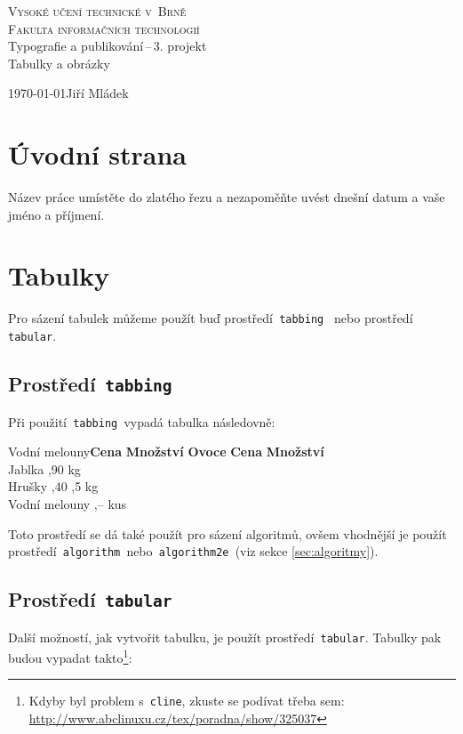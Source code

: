 \documentclass[11pt, a4paper]{article}
\begin{document}
\begin{titlepage}
    \begin{center}
        \Huge
        \textsc{Vysoké učení technické v~Brně}\\
        \huge
        \textsc{Fakulta informačních technologií}\\
        \LARGE
        Typografie a publikování\,--\,3. projekt\\
        \Huge
        Tabulky a obrázky\\
    \end{center}
    {\Large \today \hfill Jiří Mládek}
\end{titlepage}

\section{Úvodní strana}
Název práce umístěte do zlatého řezu a nezapoměňte uvést dnešní datum a vaše jméno a příjmení.

\section{Tabulky}
Pro sázení tabulek můžeme použít buď prostředí\texttt{ tabbing } nebo prostředí\texttt{ tabular}.

\subsection{Prostředí\texttt{ tabbing}}
Při použití\texttt{ tabbing }vypadá tabulka následovně:

\begin{tabbing}
  Vodní melouny\quad \=\textbf{Cena} \quad \= \textbf{Množství}  \quad \kill
  \textbf{Ovoce}    \> \textbf{Cena}    \> \textbf{Množství}  \\
  Jablka            ,90             kg     \\
  Hrušky            ,40            ,5 kg   \\
  Vodní melouny     ,--              kus    \\
\end{tabbing}
Toto prostředí se dá také použít pro sázení algoritmů, ovšem vhodnější je použít 
prostředí\texttt{ algorithm }nebo\texttt{ algorithm2e }(viz sekce \ref{sec:algoritmy}).

\subsection{Prostředí\texttt{ tabular}}
Další možností, jak vytvořit tabulku, je použít prostředí\texttt{ tabular}. Tabulky pak 
budou vypadat takto\footnote{Kdyby byl problem s\texttt{ cline}, zkuste se podívat třeba sem: \url{http://www.abclinuxu.cz/tex/poradna/show/325037}}:
\bigskip
\end{document}
